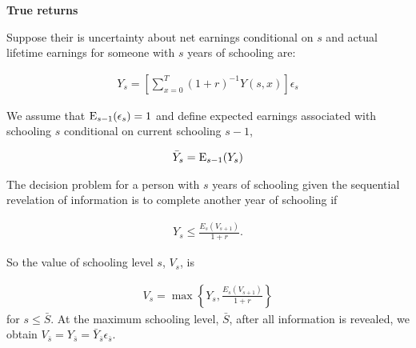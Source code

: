 \begin{frame}\begin{center}
		\LARGE\textbf{True returns}
\end{center}\end{frame}
\begin{frame}
Suppose their is uncertainty about net earnings conditional on $s$ and actual lifetime earnings for someone with $s$ years of schooling are:

\begin{align*}
Y_s = \left[\sum^T_{x = 0}(1 + r)^{-1} Y(s, x)\right]\epsilon_s
\end{align*}
\end{frame}
\begin{frame}
We assume that $\mathrm{E}_{s - 1}(\epsilon_s) = 1$ and define expected earnings associated with schooling $s$ conditional on current schooling $s - 1$,

\begin{align*}
\bar{Y}_s = \mathrm{E}_{s - 1}(Y_s)
\end{align*}
\end{frame}
\begin{frame}
The decision problem for a person with $s$ years of schooling given the sequential revelation of information is to complete another year of schooling if

\begin{align*}
Y_s \leq \frac{E_s(V_{s+1})}{1 + r}.
\end{align*}

\end{frame}
\begin{frame}
So the value of schooling level $s$, $V_s$, is

\begin{align*}
V_s = \max\left\{Y_s, \frac{E_s(V_{s+1})}{1 + r}\right\}
\end{align*}
for $s \leq \bar{S}$. At the maximum schooling level, $\bar{S}$, after all information is revealed, we obtain $V_{\bar{s}} = Y_{\bar{s}} = \bar{Y}_{\bar{s}}\epsilon_{\bar{s}}$.

\end{frame}
